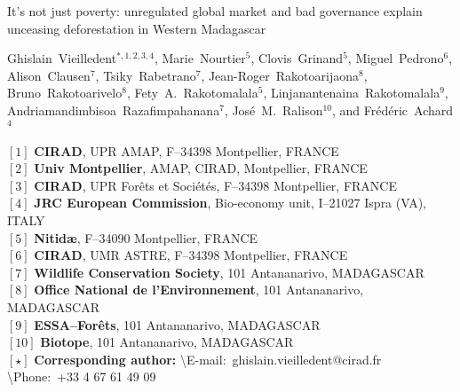 \begin{center}
  \LARGE{It's not just poverty: unregulated global market and bad governance explain unceasing deforestation in Western Madagascar}
\end{center}

\vspace{1cm}

\begin{center}
  \large{Ghislain~Vieilledent$^{*,1,2,3,4}$, Marie~Nourtier$^5$, Clovis~Grinand$^5$, 
  Miguel~Pedrono$^6$, Alison~Clausen$^7$, Tsiky~Rabetrano$^7$, Jean-Roger~Rakotoarijaona$^8$, 
  Bruno~Rakotoarivelo$^8$, Fety~A.~Rakotomalala$^5$, 
  Linjanantenaina~Rakotomalala$^9$, Andriamandimbisoa~Razafimpahanana$^7$, 
  José~M.~Ralison$^{10}$, and Frédéric~Achard$^4$}
\end{center}

\vspace{1cm}

{\small
  \begin{flushleft}
    $[1]$ \textbf{CIRAD}, UPR AMAP, F--34398 Montpellier, FRANCE\\ 
    $[2]$ \textbf{Univ Montpellier}, AMAP, CIRAD, Montpellier, FRANCE\\
    $[3]$ \textbf{CIRAD}, UPR Forêts et Sociétés, F--34398 Montpellier, FRANCE\\
    $[4]$ \textbf{JRC European Commission}, Bio-economy unit, I--21027 Ispra (VA), ITALY\\
    $[5]$ \textbf{Nitid\ae}, F--34090 Montpellier, FRANCE\\
    $[6]$ \textbf{CIRAD}, UMR ASTRE, F--34398 Montpellier, FRANCE\\
    $[7]$ \textbf{Wildlife Conservation Society}, 101 Antananarivo, MADAGASCAR\\
    $[8]$ \textbf{Office National de l'Environnement}, 101 Antananarivo, MADAGASCAR\\
    $[9]$ \textbf{ESSA--Forêts}, 101 Antananarivo, MADAGASCAR\\
    $[10]$ \textbf{Biotope}, 101 Antananarivo, MADAGASCAR
    ~\\
    $[\star]$ \textbf{Corresponding author:}
    \textbackslash{E-mail}:~ghislain.vieilledent@cirad.fr
    \textbackslash{Phone}:~+33 4 67 61 49 09\\
  \end{flushleft}}
\newpage
